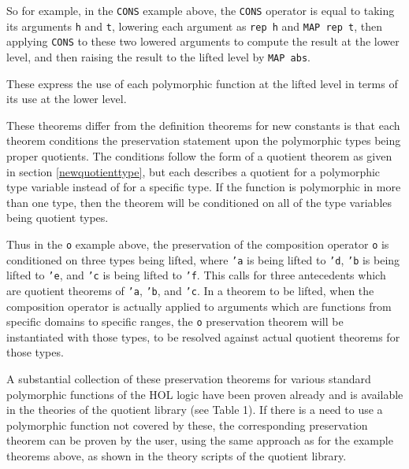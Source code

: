 \documentclass[envcountsame,runningheads]{llncs}
\begin{document}
So for example, in the {\tt CONS} example above,
the {\tt CONS} operator is equal to taking its arguments
{\tt h} and {\tt t}, lowering each argument as {\tt rep h} and {\tt MAP rep t},
then applying {\tt CONS} to these two lowered arguments to compute the
result at the lower level, and then raising the result to the lifted level
by {\tt MAP abs}.

These
express the use of each polymorphic function at the
lifted level in terms of its use at the lower level.

These theorems differ from
the definition theorems for new constants
is that each theorem conditions the preservation statement
upon the polymorphic types being 
proper quotients.  The conditions follow the form
of a quotient theorem as given in section \ref{newquotienttype},
but each describes a quotient for a polymorphic type variable
instead of for a specific type.  If the function is polymorphic in more
than one type, then the theorem will be conditioned on all of the
type variables being quotient types.  

Thus in the {\tt o} example above, the preservation
of the composition operator {\tt o}
is conditioned on three types being lifted,
where {\tt 'a} is being lifted to {\tt 'd},
{\tt 'b} is being lifted to {\tt 'e}, and
{\tt 'c} is being lifted to {\tt 'f}.
This calls for three antecedents which are quotient theorems of {\tt 'a}, 
{\tt 'b}, and {\tt 'c}.
In a theorem to be lifted, when
the composition operator is actually applied
to arguments which are functions from specific domains
to specific ranges, the {\tt o} preservation theorem will be
instantiated with those types,
to be resolved against actual quotient theorems for those types.

A substantial collection of these
preservation
theorems for various
standard polymorphic functions of the HOL logic have been proven already and
is available in the theories of the quotient library (see Table 1). 
If there is a need to use a
polymorphic function not covered by these, the corresponding
preservation
theorem can be proven by the user, using the same approach as for the example
theorems above, as shown in the theory scripts of the quotient library.
\end{document}
